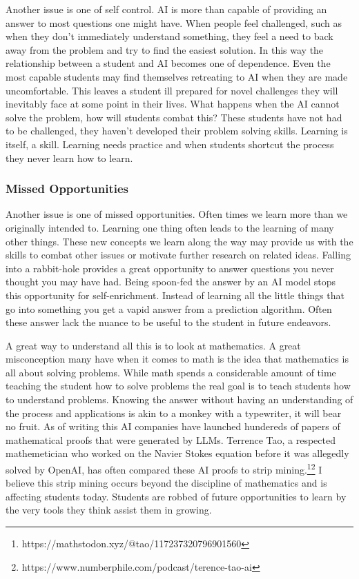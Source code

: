 \documentclass{article}[12pt]
\begin{document}
Another issue is one of self control. AI is more than capable of providing an answer to most questions one might have. When people feel challenged, such as when they don't immediately understand something, they feel a need to back away from the problem and try to find the easiest solution. In this way the relationship between a student and AI becomes one of dependence. Even the most capable students may find themselves retreating to AI when they are made uncomfortable. This leaves a student ill prepared for novel challenges they will inevitably face at some point in their lives. What happens when the AI cannot solve the problem, how will students combat this? These students have not had to be challenged, they haven't developed their problem solving skills. Learning is itself, a skill. Learning needs practice and when students shortcut the process they never learn how to learn.

\subsubsection{Missed Opportunities}
Another issue is one of missed opportunities. Often times we learn more than we originally intended to. Learning one thing often leads to the learning of many other things. These new concepts we learn along the way may provide us with the skills to combat other issues or motivate further research on related ideas. Falling into a rabbit-hole provides a great opportunity to answer questions you never thought you may have had. Being spoon-fed the answer by an AI model stops this opportunity for self-enrichment. Instead of learning all the little things that go into something you get a vapid answer from a prediction algorithm. Often these answer lack the nuance to be useful to the student in future endeavors. 

A great way to understand all this is to look at mathematics. A great misconception many have when it comes to math is the idea that mathematics is all about solving problems. While math spends a considerable amount of time teaching the student how to solve problems the real goal is to teach students how to understand problems. Knowing the answer without having an understanding of the process and applications is akin to a monkey with a typewriter, it will bear no fruit. As of writing this AI companies have launched hundereds of papers of mathematical proofs that were generated by LLMs. Terrence Tao, a respected mathemetician who worked on the Navier Stokes equation before it was allegedly solved by OpenAI, has often compared these AI proofs to strip mining.\footnote{https://mathstodon.xyz/@tao/117237320796901560}\footnote{https://www.numberphile.com/podcast/terence-tao-ai} I believe this strip mining occurs beyond the discipline of mathematics and is affecting students today. Students are robbed of future opportunities to learn by the very tools they think assist them in growing.
\end{document}

